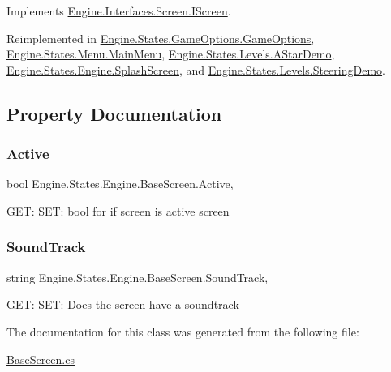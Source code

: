 Implements \hyperlink{a00466_a5f59b9b12c1bf29b1db612ed52d1cfd6}{Engine.\+Interfaces.\+Screen.\+I\+Screen}.



Reimplemented in \hyperlink{a00558_a629d2a00abd6bfcc21524911e74fee3a}{Engine.\+States.\+Game\+Options.\+Game\+Options}, \hyperlink{a00574_ad667a7ff9dea79bee26a4205418c7a61}{Engine.\+States.\+Menu.\+Main\+Menu}, \hyperlink{a00562_aaa91f362f279bd5d226f49fb150f98e3}{Engine.\+States.\+Levels.\+A\+Star\+Demo}, \hyperlink{a00554_af245506899484c6784a44550b1364b6c}{Engine.\+States.\+Engine.\+Splash\+Screen}, and \hyperlink{a00570_a4210cc45e9038a007132fbafde08fa71}{Engine.\+States.\+Levels.\+Steering\+Demo}.



\subsection{Property Documentation}
\mbox{\label{a00550_ac5d310a291bb741ffd071372bc1ba496}} 
\subsubsection{\texorpdfstring{Active}{Active}}
{\footnotesize\ttfamily bool Engine.\+States.\+Engine.\+Base\+Screen.\+Active\hspace{0.3cm}{\ttfamily [get]}, {\ttfamily [set]}}



G\+ET\+: S\+ET\+: bool for if screen is active screen 

\mbox{\label{a00550_af942c6eeee717dee53a460530f4efb3d}} 
\subsubsection{\texorpdfstring{Sound\+Track}{SoundTrack}}
{\footnotesize\ttfamily string Engine.\+States.\+Engine.\+Base\+Screen.\+Sound\+Track\hspace{0.3cm}{\ttfamily [get]}, {\ttfamily [set]}}



G\+ET\+: S\+ET\+: Does the screen have a soundtrack 



The documentation for this class was generated from the following file\+:\begin{DoxyCompactItemize}
\item 
\hyperlink{a00194}{Base\+Screen.\+cs}\end{DoxyCompactItemize}
